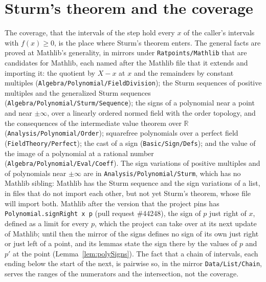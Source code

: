\section{Sturm's theorem and the coverage}\label{sec:coverage}

The coverage, that the intervals of the step hold every $x$ of the caller's intervals with
$f(x) \ge 0$, is the place where Sturm's theorem enters. The general facts are proved at Mathlib's
generality, in mirrors under \verb|Ratpoints/Mathlib| that are candidates for Mathlib, each named
after the Mathlib file that it extends and importing it: the quotient by $X - x$ at $x$ and the
remainders by constant multiples (\verb|Algebra/Polynomial/FieldDivision|); the Sturm sequences of
positive multiples and the generalized Sturm sequences (\verb|Algebra/Polynomial/Sturm/Sequence|);
the signs of a polynomial near a point and near $\pm\infty$, over a linearly ordered normed field
with the order topology, and the consequences of the intermediate value theorem over $\mathbb{R}$
(\verb|Analysis/Polynomial/Order|); squarefree polynomials over a perfect field
(\verb|FieldTheory/Perfect|); the cast of a sign (\verb|Basic/Sign/Defs|); and the value of the
image of a polynomial at a rational number (\verb|Algebra/Polynomial/Eval/Coeff|). The sign
variations of positive multiples and of polynomials near $\pm\infty$ are in
\verb|Analysis/Polynomial/Sturm|, which has no Mathlib sibling: Mathlib has the Sturm sequence and
the sign variations of a list, in files that do not import each other, but not yet Sturm's theorem,
whose file will import both. Mathlib after the version that the project pins has
\verb|Polynomial.signRight x p| (pull request \#44248), the sign of $p$ just right of $x$, defined
as a limit for every $p$, which the project can take over at its next update of Mathlib; until then
the mirror of the signs defines no sign of its own just right or just left of a point, and its
lemmas state the sign there by the values of $p$ and $p'$ at the point (Lemma~\ref{lem:polySigns}).
The fact that a chain of intervals, each ending below the start of the next, is pairwise so, in the
mirror \verb|Data/List/Chain|, serves the ranges of the numerators and the intersection, not the
coverage.


